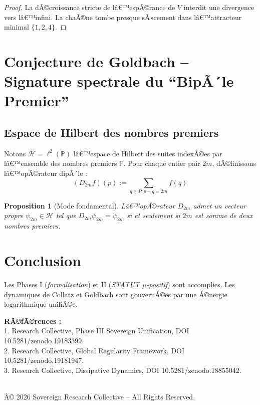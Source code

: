 \documentclass[12pt]{article}
\newtheorem{proposition}{Proposition}
\begin{document}
\begin{proof}
La dÃ©croissance stricte de lâ€™espÃ©rance de $V$ interdit une divergence vers lâ€™infini. La chaÃ®ne tombe presque sÃ»rement dans lâ€™attracteur minimal $\{1,2,4\}$.
\end{proof}

\section{Conjecture de Goldbach -- Signature spectrale du ``BipÃ´le Premier''}

\subsection{Espace de Hilbert des nombres premiers}
Notons $\mathcal H = \ell^2(\mathbb P)$ lâ€™espace de Hilbert des suites indexÃ©es par lâ€™ensemble des nombres premiers $\mathbb P$.
Pour chaque entier pair $2m$, dÃ©finissons lâ€™opÃ©rateur dipÃ´le :
$$(D_{2m}f)(p) := \sum_{q \in P, p+q=2m} f(q)$$

\begin{proposition}[Mode fondamental]
Lâ€™opÃ©rateur $D_{2m}$ admet un vecteur propre $\psi_{2m} \in \mathcal H$ tel que $D_{2m}\psi_{2m} = \psi_{2m}$ si et seulement si $2m$ est somme de deux nombres premiers.
\end{proposition}

\section*{Conclusion}
Les Phases I (\emph{formalisation}) et II (\emph{STATUT $\mu$-positif}) sont accomplies.
Les dynamiques de Collatz et Goldbach sont gouvernÃ©es par une Ã©nergie logarithmique unifiÃ©e.

\bigskip
\noindent\textbf{RÃ©fÃ©rences :}\\
1. Research Collective, Phase III Sovereign Unification, DOI 10.5281/zenodo.19183399. \\
2. Research Collective, Global Regularity Framework, DOI 10.5281/zenodo.19181947. \\
3. Research Collective, Dissipative Dynamics, DOI 10.5281/zenodo.18855042.

\medskip
{} \\
Â© 2026 Sovereign Research Collective -- All Rights Reserved.
\end{document}
